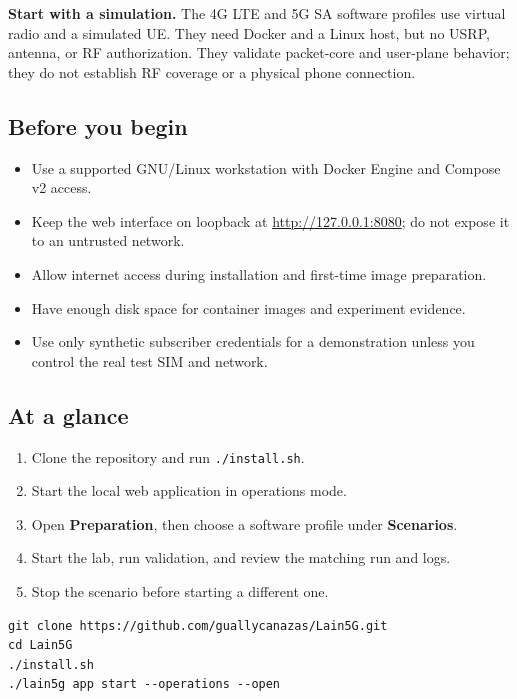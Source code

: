 \documentclass[11pt,a4paper,oneside]{article}
\newcommand{\cmd}[1]{\texttt{\small #1}}
\begin{document}
\begin{infobox}
\textbf{Start with a simulation.} The 4G LTE and 5G SA software profiles use virtual radio and a simulated UE. They need Docker and a Linux host, but no USRP, antenna, or RF authorization. They validate packet-core and user-plane behavior; they do not establish RF coverage or a physical phone connection.
\end{infobox}

\subsection*{Before you begin}
\begin{itemize}
  \item Use a supported GNU/Linux workstation with Docker Engine and Compose v2 access.
  \item Keep the web interface on loopback at \url{http://127.0.0.1:8080}; do not expose it to an untrusted network.
  \item Allow internet access during installation and first-time image preparation.
  \item Have enough disk space for container images and experiment evidence.
  \item Use only synthetic subscriber credentials for a demonstration unless you control the real test SIM and network.
\end{itemize}

\subsection*{At a glance}
\begin{enumerate}
  \item Clone the repository and run \cmd{./install.sh}.
  \item Start the local web application in operations mode.
  \item Open \textbf{Preparation}, then choose a software profile under \textbf{Scenarios}.
  \item Start the lab, run validation, and review the matching run and logs.
  \item Stop the scenario before starting a different one.
\end{enumerate}

\vspace{1mm}
\begin{center}
\begin{minipage}{0.88\linewidth}
\begin{codebox}
\begin{Verbatim}[fontsize=\small]
git clone https://github.com/guallycanazas/Lain5G.git
cd Lain5G
./install.sh
./lain5g app start --operations --open
\end{Verbatim}
\end{codebox}
\end{minipage}
\end{center}
\end{document}
